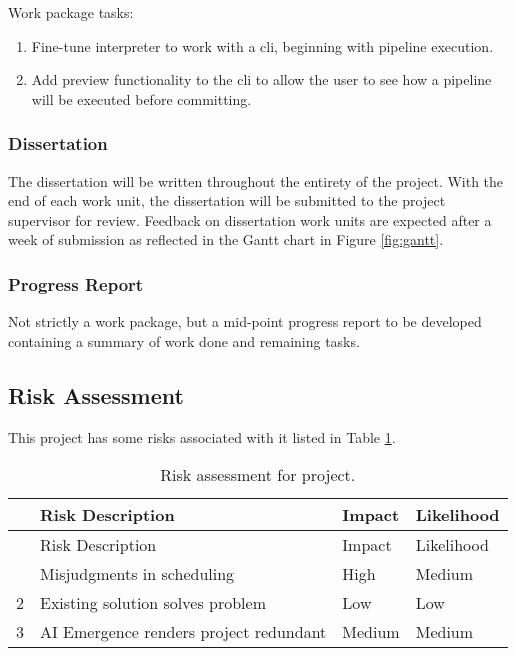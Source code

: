 Work package tasks:

\begin{enumerate}
\def\labelenumi{\arabic{enumi}.}
\tightlist
\item
  Fine-tune interpreter to work with a cli, beginning with pipeline
  execution.
\item
  Add preview functionality to the cli to allow the user to see how a
  pipeline will be executed before committing.
\end{enumerate}

\subsubsection{Dissertation}\label{dissertation}

The dissertation will be written throughout the entirety of the project.
With the end of each work unit, the dissertation will be submitted to
the project supervisor for review. Feedback on dissertation work units
are expected after a week of submission as reflected in the Gantt chart
in Figure \ref{fig:gantt}.

\subsubsection{Progress Report}\label{progress-report}

Not strictly a work package, but a mid-point progress report to be
developed containing a summary of work done and remaining tasks.

\subsection{Risk Assessment}\label{risk-assessment}

This project has some risks associated with it listed in Table
\ref{tbl:risks}.

\begin{longtable}[]{@{}llll@{}}
\caption{\label{tbl:risks}Risk assessment for project.}\tabularnewline
\toprule\noalign{}
& Risk Description & Impact & Likelihood \\
\midrule\noalign{}
\endfirsthead
\toprule\noalign{}
& Risk Description & Impact & Likelihood \\
\midrule\noalign{}
\endhead
\bottomrule\noalign{}
\endlastfoot
1 & Misjudgments in scheduling & High & Medium \\
2 & Existing solution solves problem & Low & Low \\
3 & AI Emergence renders project redundant & Medium & Medium \\
\end{longtable}

